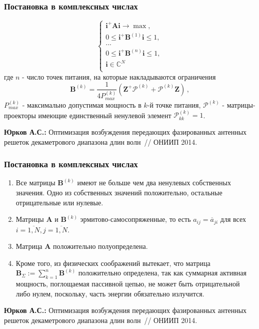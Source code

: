 \begin{frame}
    \frametitle{Постановка в комплексных числах}
   \begin{equation}
        \begin{cases}
           \textbf{i}^{+}\textbf{Ai} \rightarrow \max,\\
           0 \leq \textbf{i}^{+}\textbf{B}^{(1)}\textbf{i} \leq 1, \\
           ...\\
           0 \leq \textbf{i}^{+}\textbf{B}^{(n)}\textbf{i} \leq 1,\\
           \textbf{i} \in \mathbb{C}^N\\
         \end{cases}
         \label{eq:task2}
    \end{equation}
%
где $n$ - число точек питания, на которые накладываются ограничения
%
    \begin{equation}
        \textbf{B}^{(k)} = \frac{1}{4P_{max}^{(k)}}(\textbf{Z}^{+}\mathcal{P}^{(k)} + \mathcal{P}^{(k)}\textbf{Z}) \, ,
    \end{equation}
%
$P_{max}^{(k)}$ - максимально допустимая мощность в $k$-й точке питания, $\mathcal{P}^{(k)}$ - матрицы-проекторы имеющие единственный ненулевой элемент $\mathcal{P}^{(k)}_{kk}=1$.

\vspace{2em}
    \textbf{Юрков А.С.:} Оптимизация возбуждения передающих фазированных антенных решеток декаметрового диапазона длин волн~// ОНИИП 2014.
\end{frame}

\begin{frame}
    \frametitle{Постановка в комплексных числах}
   \begin{enumerate}
  \item Все матрицы $\textbf{B}^{(k)}$ имеют не больше чем два ненулевых собственных значения. Одно из собственных значений положительно,
  остальные отрицательные или нулевые.
  \item Матрицы $\textbf{A}$ и $\textbf{B}^{(k)}$ эрмитово-самосопряженные, то есть
  $a_{ij} = \overline{a}_{ji}$ для всех $i = \overline{1,N}, j = \overline{1,N}$.
  \item Матрица $\textbf{A}$ положительно полуопределена.
  \item Кроме того, из физических соображений вытекает, что матрица $\textbf{B}_{\Sigma}:= \sum_{k=1}^{n} \textbf{B}^{(k)}$
  положительно определена, так как суммарная активная мощность, поглощаемая пассивной цепью, не может быть отрицательной либо нулем,
  поскольку, часть энергии обязательно излучится.
\end{enumerate}

\vspace{2em}
    \textbf{Юрков А.С.:} Оптимизация возбуждения передающих фазированных антенных решеток декаметрового диапазона длин волн~// ОНИИП 2014.
\end{frame}

